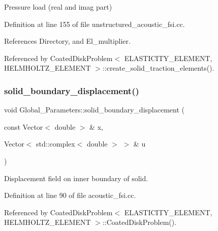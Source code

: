 Pressure load (real and imag part) 



Definition at line 155 of file unstructured\+\_\+acoustic\+\_\+fsi.\+cc.



References Directory, and El\+\_\+multiplier.



Referenced by Coated\+Disk\+Problem$<$ E\+L\+A\+S\+T\+I\+C\+I\+T\+Y\+\_\+\+E\+L\+E\+M\+E\+N\+T, H\+E\+L\+M\+H\+O\+L\+T\+Z\+\_\+\+E\+L\+E\+M\+E\+N\+T $>$\+::create\+\_\+solid\+\_\+traction\+\_\+elements().

\mbox{\label{namespaceGlobal__Parameters_ab51fa55d06d9963d363bcf966cfcc62b}} 
\subsubsection{\texorpdfstring{solid\+\_\+boundary\+\_\+displacement()}{solid\_boundary\_displacement()}}
{\footnotesize\ttfamily void Global\+\_\+\+Parameters\+::solid\+\_\+boundary\+\_\+displacement (\begin{DoxyParamCaption}\item[{const Vector$<$ double $>$ \&}]{x,  }\item[{Vector$<$ std\+::complex$<$ double $>$ $>$ \&}]{u }\end{DoxyParamCaption})}



Displacement field on inner boundary of solid. 



Definition at line 90 of file acoustic\+\_\+fsi.\+cc.



Referenced by Coated\+Disk\+Problem$<$ E\+L\+A\+S\+T\+I\+C\+I\+T\+Y\+\_\+\+E\+L\+E\+M\+E\+N\+T, H\+E\+L\+M\+H\+O\+L\+T\+Z\+\_\+\+E\+L\+E\+M\+E\+N\+T $>$\+::\+Coated\+Disk\+Problem().

\mbox{\label{namespaceGlobal__Parameters_ae0f9a80fb7510dbfbbef22582da231b7}} 
